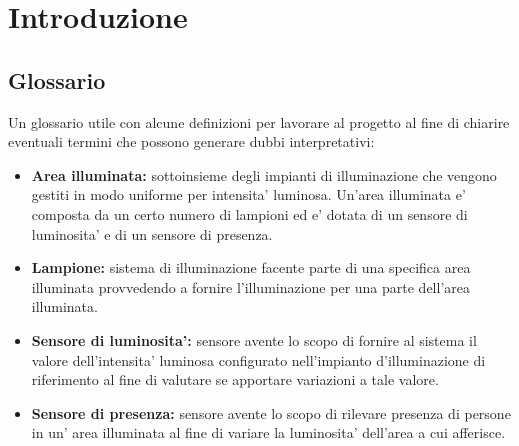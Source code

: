 \chapter{Introduzione}

\section{Glossario}
Un glossario utile con alcune definizioni per lavorare al progetto al fine di chiarire eventuali termini che possono generare
dubbi interpretativi:
\begin{itemize}
    \item \textbf{Area illuminata:} sottoinsieme degli impianti di illuminazione che vengono gestiti in
modo uniforme per intensita' luminosa. Un'area illuminata e' composta da un certo numero di lampioni ed e' dotata di un sensore 
di luminosita' e di un sensore di presenza.
    \item \textbf{Lampione:} sistema di illuminazione facente parte di una specifica area illuminata provvedendo a fornire 
    l'illuminazione per una parte dell'area illuminata.
    \item \textbf{Sensore di luminosita':} sensore avente lo scopo di fornire al sistema il valore dell'intensita' luminosa 
    configurato nell'impianto d'illuminazione di riferimento al fine di valutare se apportare variazioni a tale valore.
    \item \textbf{Sensore di presenza:} sensore avente lo scopo di rilevare presenza di persone in un' area illuminata al fine 
    di variare la luminosita' dell'area a cui afferisce.
\end{itemize}